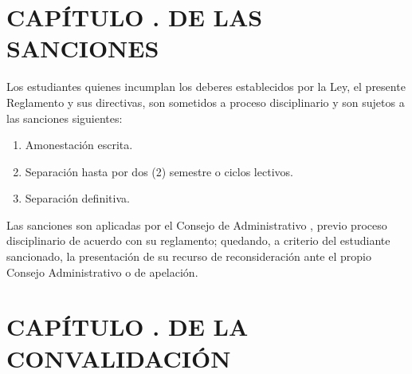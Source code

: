 \section{CAPÍTULO . DE LAS SANCIONES}
\addtocounter{re}{1}
Los estudiantes quienes incumplan los deberes establecidos por la Ley, el presente Reglamento y sus directivas, son sometidos a proceso disciplinario y son sujetos a las sanciones siguientes: 
\begin{enumerate}
\item Amonestación escrita. 
\item Separación hasta por dos (2) semestre o ciclos lectivos. 
\item Separación definitiva. 
\end{enumerate}
Las sanciones son aplicadas por el Consejo de Administrativo , previo proceso disciplinario de acuerdo con su reglamento; quedando, a criterio del estudiante sancionado, la presentación de su recurso de reconsideración ante el propio Consejo Administrativo o de apelación.
\section{CAPÍTULO . DE LA CONVALIDACIÓN}
\addtocounter{re}{1}


